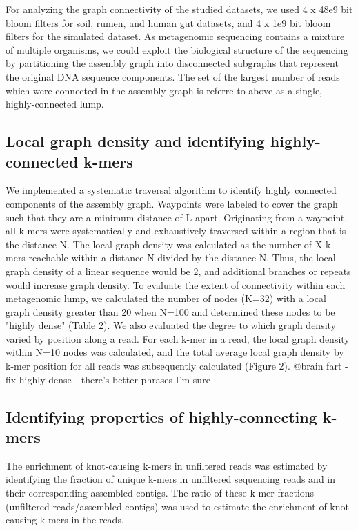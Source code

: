 \documentclass[11pt]{article} %
\begin{document}
For analyzing the graph connectivity of the studied datasets, we used 4 x 48e9 bit bloom filters for soil, rumen, and human gut datasets, and 4 x 1e9 bit bloom filters for the simulated dataset. As metagenomic sequencing contains a mixture of multiple organisms, we could exploit the biological structure of the sequencing by partitioning the assembly graph into disconnected subgraphs that represent the original DNA sequence components. The set of the largest number of reads which were connected in the assembly graph is referre to above as a single, highly-connected lump. 

\subsection{Local graph density and identifying highly-connected k-mers}
We implemented a systematic traversal algorithm to identify highly connected components of the assembly graph.  Waypoints were labeled to cover the graph such that they
are a minimum distance of L apart. Originating from a waypoint, all k-mers were systematically and exhaustively traversed within a region that is the distance N.   The local graph density was calculated as the number of X k-mers reachable within a distance N divided by the distance N.  Thus, the local graph density of a linear sequence would be 2, and additional branches or repeats would increase graph density.   To evaluate the extent of connectivity within each metagenomic lump, we calculated the number of nodes (K=32) with a local graph density greater than 20 when N=100 and determined these nodes to be "highly dense" (Table 2).  We also evaluated the degree to which graph density varied by position along a read.  For each k-mer in a read, the local graph density within N=10 nodes was calculated, and the total average local graph density by k-mer position for all reads was subsequently calculated (Figure 2).
@brain fart - fix highly dense - there's better phrases I'm sure

\subsection{Identifying properties of highly-connecting k-mers}
The enrichment of knot-causing k-mers in unfiltered reads was estimated by identifying the fraction of unique k-mers in unfiltered sequencing reads and in their corresponding assembled contigs. The ratio of these k-mer fractions (unfiltered reads/assembled contigs) was used to estimate the enrichment of knot-causing k-mers in the reads. 
	
\end{document}

